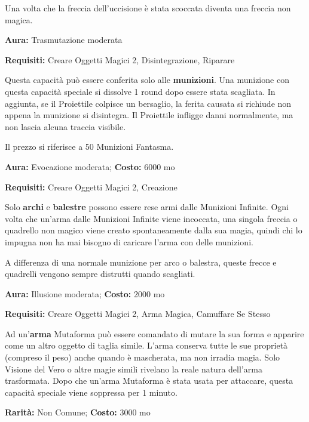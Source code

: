 \begin{multicols}{2}
Una volta che la freccia dell'uccisione è stata scoccata diventa una freccia non magica.


\textbf{Aura:} Trasmutazione moderata

\textbf{Requisiti:} Creare Oggetti Magici 2, Disintegrazione, Riparare

Questa capacità può essere conferita solo alle \textbf{munizioni}. Una munizione con questa capacità speciale si dissolve 1 round dopo essere stata scagliata. In aggiunta, se il Proiettile colpisce un bersaglio, la ferita causata si richiude non appena la munizione si disintegra. Il Proiettile infligge danni normalmente, ma non lascia alcuna traccia visibile.

Il prezzo si riferisce a 50 Munizioni Fantasma.


\textbf{Aura:} Evocazione moderata; \textbf{Costo:} 6000 mo

\textbf{Requisiti:} Creare Oggetti Magici 2, Creazione

Solo \textbf{archi} e \textbf{balestre} possono essere rese armi dalle Munizioni Infinite. Ogni volta che un'arma dalle Munizioni Infinite viene incoccata, una singola freccia o quadrello non magico viene creato spontaneamente dalla sua magia, quindi chi lo impugna non ha mai bisogno di caricare l'arma con delle munizioni.

A differenza di una normale munizione per arco o balestra, queste frecce e quadrelli vengono sempre distrutti quando scagliati.


\textbf{Aura:} Illusione moderata; \textbf{Costo:} 2000 mo

\textbf{Requisiti:} Creare Oggetti Magici 2, Arma Magica, Camuffare Se Stesso

Ad un'\textbf{arma} Mutaforma può essere comandato di mutare la sua forma e apparire come un altro oggetto di taglia simile. L'arma conserva tutte le sue proprietà (compreso il peso) anche quando è mascherata, ma non irradia magia. Solo Visione del Vero o altre magie simili rivelano la reale natura dell'arma trasformata. Dopo che un'arma Mutaforma è stata usata per attaccare, questa capacità speciale viene soppressa per 1 minuto.


\textbf{Rarità:} Non Comune; \textbf{Costo:} 3000 mo


\end{multicols}
